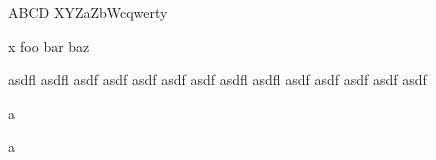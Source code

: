 \documentclass{article}
\begin{document}
\def\aaa{}
\def\yyy{Y}
\def\zzz{Z}
\def\www{W}
\def\xxx#1a#2b#3c{#1 #2 #3}
ABCD
\xxx XYZa\zzz b\www cqwerty\par
x
foo bar baz
\par
asdfl asdfl asdf asdf asdf asdf asdf
asdfl asdfl asdf asdf asdf asdf asdf%

a

a

\end{document}
